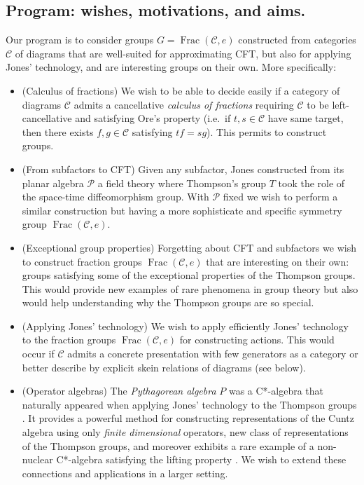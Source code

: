 \documentclass[a4paper, 12pt]{amsart}
\numberwithin{equation}{section}
\theoremstyle{definition}
\newcommand{\cC}{\mathcal C}
\DeclareMathOperator{\Frac}{Frac}
\newcommand{\cP}{\mathcal P}
\begin{document}
\subsection*{Program: wishes, motivations, and aims.}
Our program is to consider groups $G=\Frac(\cC,e)$ constructed from categories $\cC$ of diagrams that are well-suited for approximating CFT, but also for applying Jones' technology, and are interesting groups on their own.
More specifically:
\begin{itemize}
\item (Calculus of fractions)
We wish to be able to decide easily if a category of diagrams $\cC$ admits a  cancellative {\it calculus of fractions} requiring $\cC$ to be left-cancellative and satisfying Ore's property (i.e.~if $t,s\in\cC$ have same target, then there exists $f,g\in\cC$ satisfying $tf=sg$). This permits to construct groups.
\item (From subfactors to CFT) Given any subfactor, Jones constructed from its planar algebra $\cP$ a field theory where Thompson's group $T$ took the role of the space-time diffeomorphism group.
With $\cP$ fixed we wish to perform a similar construction but having a more sophisticate and specific symmetry group $\Frac(\cC,e)$. 
\item (Exceptional group properties) Forgetting about CFT and subfactors we wish to construct fraction groups $\Frac(\cC,e)$ that are interesting on their own: groups satisfying some of the exceptional properties of the Thompson groups. This would provide new examples of rare phenomena in group theory but also would help understanding why the Thompson groups are so special. 
\item (Applying Jones' technology)
We wish to apply efficiently Jones' technology to the fraction groups $\Frac(\cC,e)$ for constructing actions. 
This would occur if $\cC$ admits a concrete presentation with few generators as a category or better describe by explicit skein relations of diagrams (see below).
\item (Operator algebras) The {\it Pythagorean algebra} $P$ was a C*-algebra that naturally appeared when applying Jones' technology to the Thompson groups \cite{Brothier-Jones19bis}.
It provides a powerful method for constructing representations of the Cuntz algebra using only {\it finite dimensional} operators, new class of representations of the Thompson groups, and moreover exhibits a rare example of a non-nuclear C*-algebra satisfying the lifting property \cite{Cuntz77,Brothier-Jones19bis,Brothier-Wijesena22,Brothier-Wijesena22bis,Courtney21}.
We wish to extend these connections and applications in a larger setting.
\end{itemize}
\end{document}
